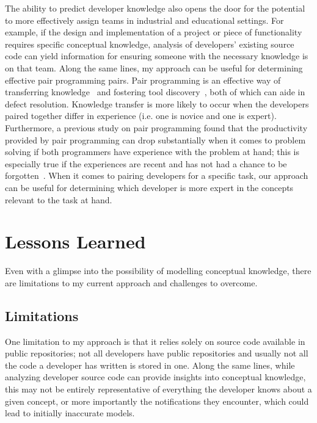 The ability to predict developer knowledge also opens the door for the potential to more effectively assign  teams in industrial and educational settings. For example, if the design and implementation of a project or piece of functionality requires specific conceptual knowledge, analysis of developers' existing source code can yield information for ensuring someone with the necessary knowledge is on that team.
Along the same lines, my approach can be useful for determining effective pair programming pairs. 
Pair programming is an effective way of transferring knowledge~\cite{plonka2015knowledge} and fostering tool discovery~\cite{murphy2011peer}, both of which can aide in defect resolution. Knowledge transfer is more likely to occur when the developers paired together differ in experience (i.e. one is novice and one is expert). Furthermore, a previous study on pair programming found that the productivity provided by pair programming can drop substantially when it comes to problem solving if both programmers have experience with the problem at hand; this is especially true if the experiences are recent and has not had a chance to be forgotten~\cite{lui2006pair}. When it comes to pairing developers for a specific task, our approach can be useful for determining which developer is more expert in the concepts relevant to the task at hand. 

\section{Lessons Learned}\label{sec:challenges}
Even with a glimpse into the possibility of modelling conceptual knowledge, there are limitations to my current approach and challenges to overcome.

\subsection{Limitations}
One limitation to my approach is that it relies solely on source code available in public repositories; not all developers have public repositories and usually not all the code a developer has written is stored in one.
Along the same lines, while analyzing developer source code can provide insights into conceptual knowledge, this may not be entirely representative of everything the developer knows about a given concept, or more importantly the notifications they encounter, which could lead to initially inaccurate models.

